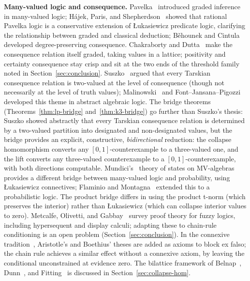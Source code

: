 \documentclass[11pt,a4paper]{article}
\begin{document}
\textbf{Many-valued logic and consequence.}
Pavelka~\cite{pavelka1979i} introduced graded inference
in many-valued logic;
H\'ajek, Paris, and Shepherdson~\cite{hajek2000} showed that
rational Pavelka logic is a conservative extension of
\L ukasiewicz predicate logic, clarifying the relationship between
graded and classical deduction;
B\v{e}hounek and Cintula~\cite{behounek2006} developed
degree-preserving consequence.
Chakraborty and Dutta~\cite{chakraborty2019} make the consequence
relation itself graded, taking values in a lattice; positivity and
certainty consequence stay crisp and sit at the two ends of the
threshold family noted in Section~\ref{sec:conclusion}.
Suszko~\cite{suszko1977} argued that every Tarskian consequence
relation is two-valued at the level of consequence (though not
necessarily at the level of truth values);
Malinowski~\cite{malinowski1993} and
Font--Jansana--Pigozzi~\cite{font2003} developed this theme in
abstract algebraic logic.
The bridge theorems
(Theorems~\ref{thm:lp-bridge} and~\ref{thm:k3-bridge})
go further than Suszko's thesis: Suszko showed abstractly that
every Tarskian consequence relation is determined by a
two-valued partition into designated and non-designated values,
but the bridge provides an explicit, constructive,
\emph{bidirectional} reduction: the collapse homomorphism
converts any $[0,1]$-counterexample to a three-valued one,
and the lift converts any three-valued counterexample to a
$[0,1]$-counterexample, with both directions computable.
Mundici's~\cite{mundici2011} theory of states on MV-algebras
provides a different bridge between many-valued logic and
probability, using \L ukasiewicz connectives;
Flaminio and Montagna~\cite{flaminio2009} extended this to a
probabilistic logic.
The product bridge differs in using the product t-norm (which
preserves the interior) rather than \L ukasiewicz (which can
collapse interior values to zero).
Metcalfe, Olivetti, and Gabbay~\cite{metcalfe2009} survey proof
theory for fuzzy logics, including hypersequent and
display calculi; adapting these to chain-rule conditioning is an
open problem (Section~\ref{sec:conclusion}).
In the connexive tradition~\cite{wansing2024}, Aristotle's and
Boethius' theses are added as axioms to block ex falso;
the chain rule achieves a similar effect without a connexive
axiom, by leaving the conditional unconstrained at evidence zero.
The bilattice framework of
Belnap~\cite{belnap1977}, Dunn~\cite{dunn1976}, and
Fitting~\cite{fitting1991,fitting2006}
is discussed in Section~\ref{sec:collapse-hom}.

\end{document}
